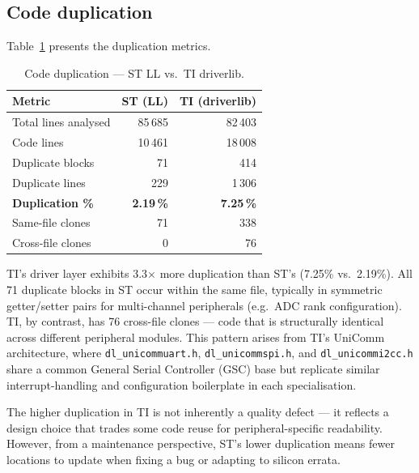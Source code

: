 \subsection{Code duplication}
\label{subsec:ti-dup}

Table~\ref{tab:ti-dup} presents the duplication metrics.

\begin{table}[H]
\centering
\caption{Code duplication --- ST LL vs.\ TI driverlib.}
\label{tab:ti-dup}
\begin{tabular}{l r r}
\toprule
\textbf{Metric} & \textbf{ST (LL)} & \textbf{TI (driverlib)} \\
\midrule
Total lines analysed     &    85\,685 &    82\,403 \\
Code lines               &    10\,461 &    18\,008 \\
Duplicate blocks         &        71 &       414 \\
Duplicate lines          &       229 &     1\,306 \\
\textbf{Duplication \%}  & \textbf{2.19\,\%} & \textbf{7.25\,\%} \\
\midrule
Same-file clones         &        71 &       338 \\
Cross-file clones        &         0 &        76 \\
\bottomrule
\end{tabular}
\end{table}

TI's driver layer exhibits 3.3$\times$ more duplication than ST's (7.25\% vs.\ 2.19\%).
All 71 duplicate blocks in ST occur within the same file, typically in symmetric
getter/setter pairs for multi-channel peripherals (e.g.\ ADC rank configuration).
TI, by contrast, has 76 cross-file clones --- code that is structurally identical across
different peripheral modules. This pattern arises from TI's UniComm architecture, where
\texttt{dl\_unicommuart.h}, \texttt{dl\_unicommspi.h}, and \texttt{dl\_unicommi2cc.h}
share a common General Serial Controller (GSC) base but replicate similar interrupt-handling
and configuration boilerplate in each specialisation.

The higher duplication in TI is not inherently a quality defect --- it reflects a design
choice that trades some code reuse for peripheral-specific readability. However, from a
maintenance perspective, ST's lower duplication means fewer locations to update when fixing
a bug or adapting to silicon errata.

